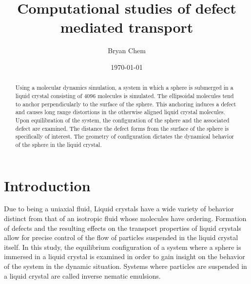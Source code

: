 \documentclass[preprint, aps]{revtex4-1}
\begin{document}

\title{Computational studies of defect mediated transport}
\author{Bryan Chem}
\date{\today}

\begin{abstract}
Using a molecular dynamics simulation, a system in which a sphere is submerged 
in a liquid crystal consisting of 4096 molecules is simulated. The ellipsoidal 
molecules tend to anchor perpendicularly to the surface of the sphere. This
anchoring induces a defect and causes long range distortions in the 
otherwise aligned liquid crystal molecules. Upon equilibration of the system, 
the configuration of the sphere and the associated defect are examined. The 
distance the defect forms from the surface of the sphere is specifically of 
interest. The geometry of configuration dictates the dynamical behavior of the 
sphere in the liquid crystal.

\end{abstract}

\maketitle

\tableofcontents

\newpage

\section*{Introduction}
Due to being a uniaxial fluid, Liquid crystals have a wide variety of 
behavior distinct from that of an isotropic fluid whose molecules have ordering.
Formation of defects and the resulting effects on the transport properties of 
liquid crystals allow for precise control of the flow of particles suspended in
the liquid crystal itself. In this study, the equilibrium configuration of a
system where a sphere is immersed in a liquid crystal is examined in order to 
gain insight on the behavior of the system in the dynamic situation. Systems 
where particles are suspended in a liquid crystal are called inverse nematic 
emulsions. 
\end{document}
